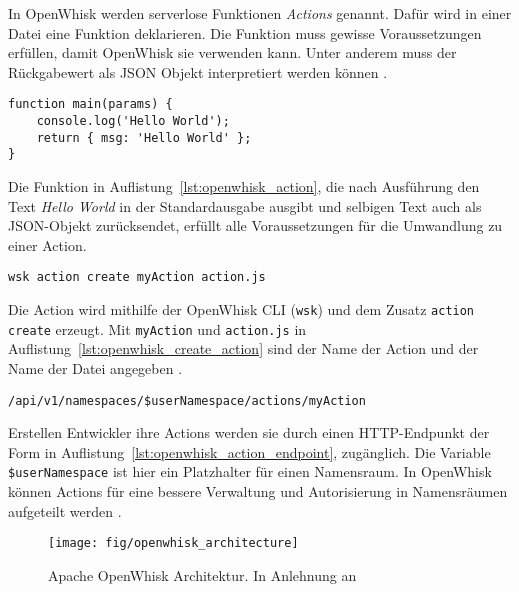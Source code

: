 In OpenWhisk werden serverlose Funktionen \emph{Actions} genannt.
Dafür wird in einer Datei eine Funktion deklarieren.
Die Funktion muss gewisse Voraussetzungen erfüllen,
damit OpenWhisk sie verwenden kann.
Unter anderem muss der Rückgabewert als JSON Objekt
interpretiert werden können \cite{OpenWhiskGithubActions}.\\

\begin{lstlisting}[caption={Hello World JS Funktion. In Anlehnung an \cite{OpenWhiskGithub} \cite{OpenWhiskGithubActions}}, label={lst:openwhisk_action}]
function main(params) {
    console.log('Hello World');
    return { msg: 'Hello World' };
}
\end{lstlisting}

Die Funktion in Auflistung~\ref{lst:openwhisk_action},
die nach Ausführung den Text \emph{Hello World}
in der Standardausgabe ausgibt und selbigen Text
auch als JSON-Objekt zurücksendet, erfüllt alle Voraussetzungen
für die Umwandlung zu einer Action.\\

\begin{lstlisting}[caption=Erstellen einer Action \cite{OpenWhiskGithub}, label={lst:openwhisk_create_action}]
wsk action create myAction action.js
\end{lstlisting}

Die Action wird mithilfe der OpenWhisk CLI (\texttt{wsk})
und dem Zusatz \texttt{action create} erzeugt.
Mit \texttt{myAction} und \texttt{action.js} 
in Auflistung~\ref{lst:openwhisk_create_action}
sind der Name der Action und der Name der Datei angegeben
\cite{OpenWhiskGithub}.\\

\begin{lstlisting}[caption=Action Endpunkt \cite{OpenWhiskGithub}, label={lst:openwhisk_action_endpoint}]
/api/v1/namespaces/$userNamespace/actions/myAction
\end{lstlisting}

Erstellen Entwickler ihre Actions werden sie durch
einen HTTP-Endpunkt der Form in Auflistung~\ref{lst:openwhisk_action_endpoint},
zugänglich.
Die Variable \texttt{\$userNamespace} ist hier ein
Platzhalter für einen Namensraum.
In OpenWhisk können Actions für eine bessere
Verwaltung und Autorisierung in Namensräumen aufgeteilt werden
\cite{OpenWhiskGithub}.

\begin{figure}
    \centering
    \texttt{[image: fig/openwhisk\_architecture]}
    \caption{Apache OpenWhisk Architektur. In Anlehnung an \cite{OpenWhiskGithub}}
    \label{fig:openwhisk_architecture}
\end{figure}

